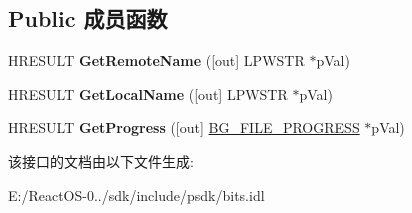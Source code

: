 \subsection*{Public 成员函数}
\begin{DoxyCompactItemize}
\item 
\mbox{\label{interface_i_background_copy_file_a59af0e08defc2a1b1d1464095d4799ef}} 
H\+R\+E\+S\+U\+LT {\bfseries Get\+Remote\+Name} (\mbox{[}out\mbox{]} L\+P\+W\+S\+TR $\ast$p\+Val)
\item 
\mbox{\label{interface_i_background_copy_file_a9e92c94a5330ff3ea14c126c24fb81d2}} 
H\+R\+E\+S\+U\+LT {\bfseries Get\+Local\+Name} (\mbox{[}out\mbox{]} L\+P\+W\+S\+TR $\ast$p\+Val)
\item 
\mbox{\label{interface_i_background_copy_file_a3ce5b6c0c16efe84970dfc276ade2001}} 
H\+R\+E\+S\+U\+LT {\bfseries Get\+Progress} (\mbox{[}out\mbox{]} \hyperlink{struct_i_background_copy_file_1_1___b_g___f_i_l_e___p_r_o_g_r_e_s_s}{B\+G\+\_\+\+F\+I\+L\+E\+\_\+\+P\+R\+O\+G\+R\+E\+SS} $\ast$p\+Val)
\end{DoxyCompactItemize}


该接口的文档由以下文件生成\+:\begin{DoxyCompactItemize}
\item 
E\+:/\+React\+O\+S-\/0../sdk/include/psdk/bits.\+idl\end{DoxyCompactItemize}
